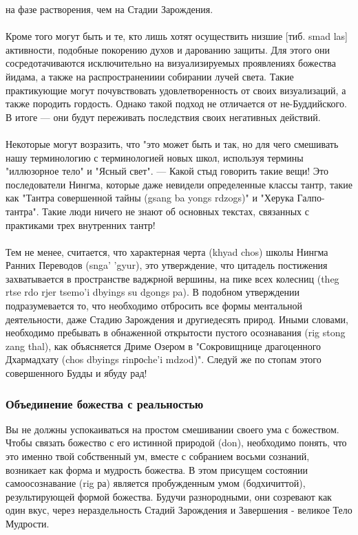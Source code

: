 \begin{siderules}
на фазе растворения, чем на Стадии Зарождения.\\
\\
Кроме того могут быть и те, кто лишь хотят осуществить низшие [тиб. smad las] активности,
подобные покорению духов и дарованию защиты. Для этого они сосредотачиваются
исключительно на визуализируемых проявлениях божества йидама, а также на
распространениии собирании лучей света. Такие практикующие могут почувствовать
удовлет\-воренность от своих визуализаций, а также породить гордость. Однако такой подход
не отличается от не-Буддийского. В итоге — они будут переживать последствия своих
негативных действий.\\
\\
Некоторые могут возразить, что "это может быть и так, но для чего смешивать нашу
терминологию с терминологией новых школ, используя термины "иллюзорное тело" и
"Ясный свет". — Какой стыд говорить такие вещи! Это последователи Нингма, которые даже
невидели определенные классы тантр, такие как "Тантра совершенной тайны (gsang ba yongs
rdzogs)" и "Херука Галпо-тантра". Такие люди ничего не знают об основных текстах,
связанных с практиками трех внутренних тантр!\\
\\
Тем не менее, считается, что характерная черта (khyad chos) школы Нингма Ранних
Переводов (snga' 'gyur), это утверждение, что цитадель постижения захватывается в
пространстве ваджрной вершины, на пике всех колесниц (theg rtse rdo rjer tsemo'i dbyings su
dgongs pa). В подобном утверждении подразумевается то, что необходимо отбросить все
формы ментальной деятельности, даже Стадию Зарождения и другиедесять природ. Иными
словами, необходимо пребывать в обнаженной открытости пустого осознавания (rig stong
zang thal), как объясняется Дриме Озером в "Сокровищнице драгоценного Дхармадхату (chos
dbyings rinроche'i mdzod)". Следуй же по стопам этого совершенного Будды и ябуду рад!
\end{siderules}

\subsubsection{Объединение божества с реальностью}
Вы не должны успокаиваться на простом смешивании своего ума с божеством. Чтобы
связать божество с его истинной природой (don), необходимо понять, что это именно твой
собственный ум, вместе с собранием восьми сознаний, возникает как форма и мудрость
божества. В этом присущем состоянии самоосознавание (rig ра) является пробужденным
умом (бодхи\-читтой), результирующей формой божества. Будучи разнородными, они
созревают как один вкус, через нераздельность Стадий Зарождения и Завершения - великое
Тело Мудрости.

